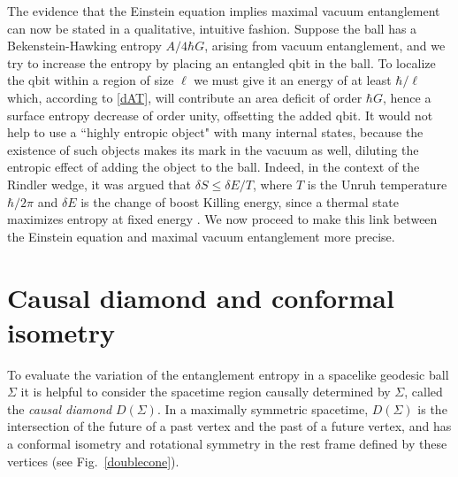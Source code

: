 \documentclass[aps,prd,twocolumn,showpacs,groupedaddress,nofootinbib,longbibliography]{revtex4-1}
\def\d{\delta}\def\D{\Delta}
\begin{document}
The evidence that the Einstein equation implies 
maximal vacuum entanglement can now be stated in a qualitative, intuitive fashion. 
Suppose the ball has a Bekenstein-Hawking entropy $A/4\hbar G$, arising from vacuum entanglement, and we try to increase
the entropy by placing an entangled qbit in the ball. 
To localize the qbit within a region of size $\ell$ we must give it an energy of
at least $\hbar/\ell$ which, according to \eqref{dAT}, will contribute an area deficit of order 
$\hbar G$, hence a surface entropy decrease of order unity, offsetting the
added qbit. It would not help to use a ``highly entropic object" with many internal states, because the existence of such objects makes its mark in
the vacuum as well, diluting the entropic effect of adding the object to the ball. Indeed, in the context of the Rindler wedge, it was argued that $\delta S \le \delta E/T$, where $T$ is the Unruh temperature $\hbar/2\pi$ and $\d E$ is the change of boost Killing energy, since a thermal state maximizes entropy at fixed energy \cite{Marolf:2003sq, Marolf:2004et}.
We now proceed to make this link between the Einstein equation and maximal vacuum entanglement more precise.


\section{Causal diamond and conformal isometry}

To evaluate the variation of the entanglement entropy in a spacelike geodesic ball $\Sigma$ 
it is helpful to consider the spacetime region causally determined by $\Sigma$,
called the {\it causal diamond} $D(\Sigma)$. 
In a maximally symmetric spacetime, $D(\Sigma)$
is the intersection of the future of a past vertex and the past of a future vertex,
and has a conformal isometry and rotational symmetry in the rest frame defined by these vertices
(see Fig.~\ref{doublecone}). 
\end{document}
